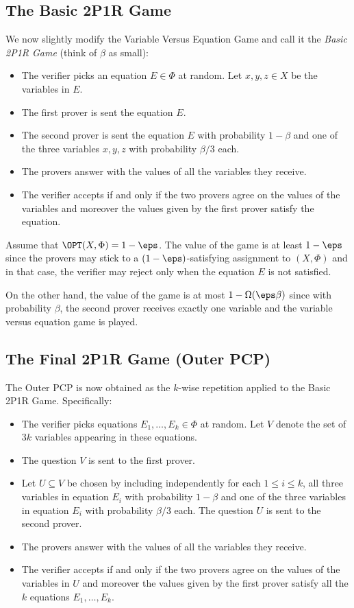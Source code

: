 \subsection{The Basic 2P1R Game}

We now slightly modify the Variable Versus Equation Game and call it the \emph{Basic 2P1R Game}
(think of $\beta$ as small):


\begin{itemize}
\item The verifier picks an equation $E \in \Phi$ at random. Let $x, y, z \in X$ be the variables in $E$.
\item The first prover is sent the equation $E$.
\item The second prover is sent the equation $E$ with probability $1-\beta$ and one of the three
variables $x,y, z$ with probability ${\beta}/{3}$ each.
\item The provers answer with the values of all the variables they receive.
\item The verifier accepts if and only if the two provers agree on the
      values of the variables and moreover the values given by the first prover
      satisfy the equation.
\end{itemize}

Assume that $\OPT(X,\Phi) = 1-\eps$.  The value of the game is at least $1-\eps$ since the provers
may stick to a $(1-\eps)$-satisfying assignment to $(X,\Phi)$ and in that case, the verifier may reject only
when the equation $E$ is not satisfied.

On the other hand, the value of the game is at most
$1-\Omega(\eps \beta)$ since with probability $\beta$, the second prover receives exactly one
variable and the variable versus equation game is played.

\subsection{The Final 2P1R Game (Outer PCP)}

The Outer PCP is now obtained as the $k$-wise repetition applied to the Basic 2P1R Game. Specifically:

\begin{itemize}
\item The verifier picks equations $E_1,\ldots,E_k \in \Phi$ at random. Let $V$ denote the set of $3k$ variables appearing in these equations.
\item The question $V$ is sent to the first prover.
\item Let $U \subseteq V$ be chosen by including independently for each $1 \leq i \leq k$, all three variables in equation $E_i$ with probability $1-\beta$ and one of the three variables in equation
    $E_i$ with probability ${\beta}/{3}$ each. The question $U$ is sent to the second prover.
\item The provers answer with the values of all the variables they receive.
\item The verifier accepts if and only if the two provers agree on the
      values of the variables in $U$ and moreover the values given by the first prover
      satisfy all the $k$ equations $E_1, \ldots, E_k$.
\end{itemize}

